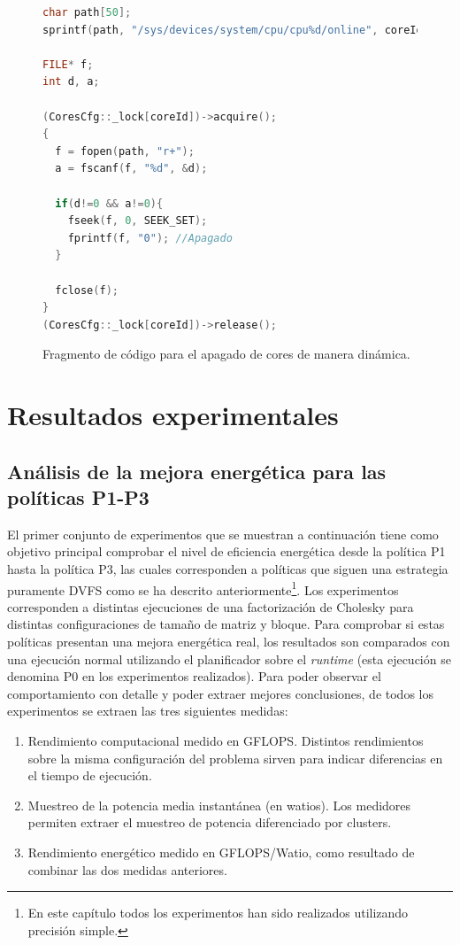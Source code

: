 \begin{figure}
  \centering
\begin{lstlisting}[language=C++]
char path[50];
sprintf(path, "/sys/devices/system/cpu/cpu%d/online", coreId);

FILE* f;
int d, a;

(CoresCfg::_lock[coreId])->acquire();
{
  f = fopen(path, "r+");
  a = fscanf(f, "%d", &d);
	
  if(d!=0 && a!=0){
    fseek(f, 0, SEEK_SET);
    fprintf(f, "0"); //Apagado
  }
	
  fclose(f);
}
(CoresCfg::_lock[coreId])->release();
\end{lstlisting}
  \caption{Fragmento de código para el apagado de cores de manera
    dinámica.}
  \label{fig:lst:apagado-cores}
\end{figure}





\section{Resultados experimentales}
\subsection{Análisis de la mejora energética para las políticas P1-P3}
El primer conjunto de experimentos que se muestran a continuación tiene
como objetivo principal comprobar el nivel de eficiencia energética desde
la política P1 hasta la política P3, las cuales corresponden a políticas
que siguen una estrategia puramente DVFS como se ha descrito
anteriormente\footnote{En este capítulo todos los experimentos han sido
  realizados utilizando precisión simple.}. Los experimentos corresponden a
distintas ejecuciones de una factorización de Cholesky para distintas
configuraciones de tamaño de matriz y bloque. Para comprobar si estas
políticas presentan una mejora energética real, los resultados son
comparados con una ejecución normal utilizando el planificador \botlev sobre
el \emph{runtime} \ompss (esta ejecución se denomina P0 en los experimentos
realizados). Para poder observar el comportamiento con detalle y poder
extraer mejores conclusiones, de todos los experimentos se extraen las tres
siguientes medidas:
\begin{enumerate}
\item Rendimiento computacional medido en GFLOPS. Distintos rendimientos
  sobre la misma configuración del problema sirven para indicar
  diferencias en el tiempo de ejecución.
\item Muestreo de la potencia media instantánea (en watios). Los medidores
  permiten extraer el muestreo de potencia diferenciado por clusters.
\item Rendimiento energético medido en GFLOPS/Watio, como resultado de
  combinar las dos medidas anteriores.
\end{enumerate}

